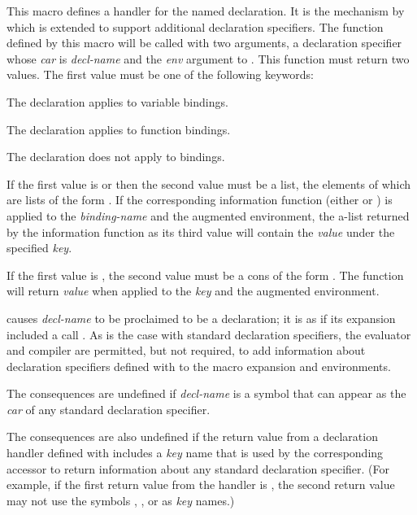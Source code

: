 \begin{newer}
\begin{defmac}
  This macro defines a handler for the named declaration.  It is the mechanism by which
   is extended to support additional declaration
  specifiers.  The function defined by this macro will be called with two
  arguments, a declaration specifier whose {\it car} is {\it decl-name}
  and the {\it env} argument to
  .  This function must return two values.  The
  first value must be one of the following keywords:
\begin{indentdesc}{7pc}
\item[\cd{:variable}]     The declaration applies to variable bindings.
\item[\cd{:function}]     The declaration applies to function bindings.
\item[\cd{:declare}]      The declaration does not apply to bindings.
\end{indentdesc}
If the first value is  or 
then the second value must be a list, the elements of which are lists of the
  form .  If the corresponding information
  function (either  or ) is applied to
  the {\it binding-name} and the augmented environment, the a-list returned
  by the information function as its third value will contain the {\it value}
  under the specified {\it key}.

  If the first value is , the second value must be a cons
  of the form .  The function
   will return {\it value} when applied to the
  {\it key} and the augmented environment.

   causes {\it decl-name} to be proclaimed to be a
  declaration; it is as if its expansion included a call .  As is the case with standard
  declaration specifiers, the evaluator and compiler are permitted,
  but not required, to add information about declaration specifiers
  defined with  to the macro expansion and 
  environments.

  The consequences are undefined if {\it decl-name} is a symbol that can
  appear as the {\it car} of any standard declaration specifier.

  The consequences are also undefined if the return value from a 
  declaration handler defined with  includes a {\it key} name
  that is used by the corresponding accessor to return information about
  any standard declaration specifier.  (For example, if
  the first return value from the handler is , the second return
  value may not use the symbols , , or 
  as {\it key} names.)


\end{defmac}
\end{newer}
